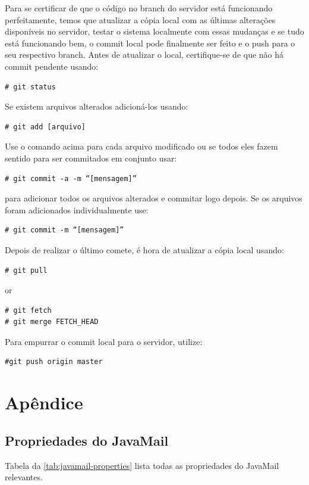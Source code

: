 \documentclass[envcountsame,envcountchap]{svmono}
\begin{document}
Para se certificar de que o código no branch do servidor está funcionando perfeitamente, temos que atualizar a cópia local com as últimas alterações disponíveis no servidor, testar o sistema localmente com essas mudanças e se tudo está funcionando bem, o commit local pode finalmente ser feito e o push para o seu respectivo branch. Antes de atualizar o local, certifique-se de que não há commit pendente usando:
\begin{verbatim}
# git status
\end{verbatim}
Se existem arquivos alterados adicioná-los usando:
\begin{verbatim}
# git add [arquivo]
\end{verbatim}
Use o comando acima para cada arquivo modificado ou se todos eles fazem sentido para ser commitados em conjunto usar:
\begin{verbatim}
# git commit -a -m “[mensagem]”
\end{verbatim}
para adicionar todos os arquivos alterados e commitar logo depois. Se os arquivos foram adicionados individualmente use:
\begin{verbatim}
# git commit -m “[mensagem]”
\end{verbatim}
Depois de realizar o último comete, é hora de atualizar a cópia local usando:
\begin{verbatim}
# git pull
\end{verbatim}
or
\begin{verbatim}
# git fetch
# git merge FETCH_HEAD
\end{verbatim}

Para empurrar o commit local para o servidor, utilize:

\begin{verbatim}
#git push origin master
\end{verbatim}

\part*{Apêndice}

\chapter*{Propriedades do JavaMail}

Tabela da \ref{tab:javamail-properties} lista todas as propriedades do JavaMail relevantes.
\end{document}

